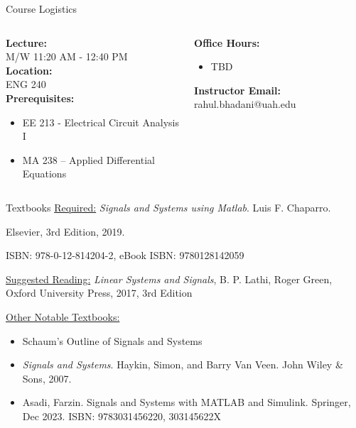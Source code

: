 \documentclass[aspectratio=169,xcolor=dvipsnames,svgnames,x11names,fleqn]{beamer}
\begin{document}

\begin{frame}{Course Logistics
}
  \begin{columns}[T] %
    \begin{column}{0.5\textwidth}
      \textbf{Lecture:} \\
      M/W 11:20 AM - 12:40 PM \\
      \vspace{0.3cm}
      \textbf{Location:} \\
      ENG 240 \\
      \vspace{0.3cm}
      \textbf{Prerequisites:}
      \begin{itemize}
        \item EE 213 - Electrical Circuit Analysis I
        \item MA 238 – Applied Differential Equations
      \end{itemize}
    \end{column}
    \begin{column}{0.5\textwidth}
      \textbf{Office Hours:}
      \begin{itemize}
        \item TBD
      \end{itemize}
      \textbf{Instructor Email:} rahul.bhadani@uah.edu
    \end{column}
  \end{columns}
\end{frame}

\begin{frame}{Textbooks}
    \underline{Required:} \emph{\color{DarkGreen}Signals and Systems using Matlab}. Luis F. Chaparro. \par{\color{DarkRed}Elsevier, 3rd Edition, 2019}. \par ISBN: 978-0-12-814204-2, eBook ISBN: 9780128142059\par\vspace{5pt}

        \underline{Suggested Reading:} \textit{Linear Systems and Signals}, B. P. Lathi, Roger Green, Oxford University Press, 2017, 3rd Edition

        \underline{Other Notable Textbooks:}
        \begin{itemize}
            \item Schaum's Outline of Signals and Systems
            \item \textit{Signals and Systems}. Haykin, Simon, and Barry Van Veen. John Wiley \& Sons, 2007.
            \item Asadi, Farzin. Signals and Systems with MATLAB and Simulink. Springer, Dec 2023. ISBN: 9783031456220, 303145622X
        \end{itemize}
\end{frame}
\end{document}
